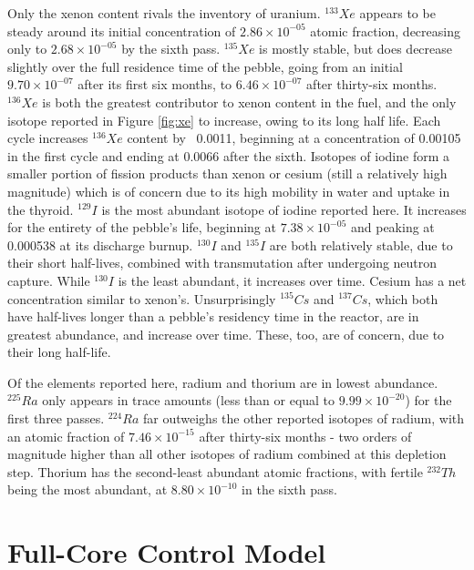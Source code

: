 Only the xenon content rivals the inventory of uranium.  $^{133}Xe$ appears to be steady around its initial concentration of $2.86\times10^{-05}$ atomic fraction, decreasing only to $2.68\times10^{-05}$ by the sixth pass.  $^{135}Xe$ is mostly stable, but does decrease slightly over the full residence time of the pebble, going from an initial $9.70\times10^{-07}$ after its first six months, to  $6.46\times10^{-07}$ after thirty-six months.  $^{136}Xe$ is both the greatest contributor to xenon content in the fuel, and the only isotope reported in  Figure \ref{fig:xe} to increase, owing to its long half life.  Each cycle increases $^{136}Xe$ content by ~0.0011, beginning at a concentration of 0.00105 in the first cycle and ending at 0.0066 after the sixth.  Isotopes of iodine form a smaller portion of fission products than xenon or cesium (still a relatively high magnitude) which is of concern due to its high mobility in water and uptake in the thyroid.  $^{129}I$ is the most abundant isotope of iodine reported here.  It increases for the entirety of the pebble's life, beginning at $7.38\times10^{-05}$ and peaking at 0.000538 at its discharge burnup.  $^{130}I$ and $^{135}I$ are both relatively stable, due to their short half-lives, combined with transmutation after undergoing neutron capture.  While $^{130}I$ is the least abundant, it increases over time.  Cesium has a net concentration similar to xenon's.  Unsurprisingly $^{135}Cs$ and $^{137}Cs$, which both have half-lives longer than a pebble's residency time in the reactor, are in greatest abundance, and increase over time.  These, too, are of concern, due to their long half-life.

Of the elements reported here, radium and thorium are in lowest abundance.  $^{225}Ra$ only appears in trace amounts (less than or equal to $9.99\times10^{-20}$) for the first three passes.  $^{224}Ra$ far outweighs the other reported isotopes of radium, with an atomic fraction of $7.46\times10^{-15}$ after thirty-six months - two orders of magnitude higher than all other isotopes of radium combined at this depletion step.  Thorium has the second-least abundant atomic fractions, with fertile $^{232}Th$ being the most abundant, at $8.80\times10^{-10}$ in the sixth pass.

\section{Full-Core Control Model}
\label{res-control}

